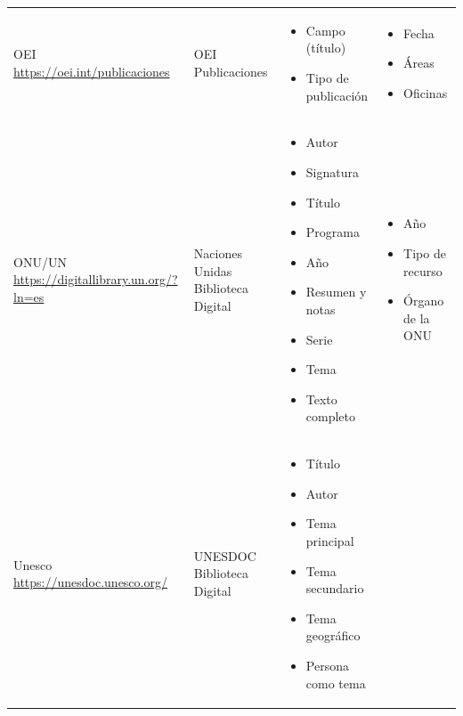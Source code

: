 \begin{table}[htpb]
\begin{threeparttable}
\begin{tabular}{
>{\raggedright\arraybackslash}p{}
>{\raggedright\arraybackslash}p{}
>{\raggedright\arraybackslash}p{}
>{\raggedright\arraybackslash}p{}}
    OEI \url{https://oei.int/publicaciones} & 
    OEI Publicaciones &
        \begin{itemize}[leftmargin=*, nosep]
            \item Campo (título)
            \item Tipo de publicación
        \end{itemize}
     &
        \begin{itemize}[leftmargin=*, nosep]
            \item Fecha
            \item Áreas
            \item Oficinas
        \end{itemize}
     \\ 
    ONU/UN \url{https://digitallibrary.un.org/?ln=es} &
    Naciones Unidas Biblioteca Digital &
        \begin{itemize}[leftmargin=*, nosep]
            \item Autor
            \item Signatura
            \item Título
            \item Programa
            \item Año
            \item Resumen y notas
            \item Serie
            \item Tema
            \item Texto completo
        \end{itemize}
     &
        \begin{itemize}[leftmargin=*, nosep]
            \item Año
            \item Tipo de recurso
            \item Órgano de la ONU
        \end{itemize}
     \\ 
    Unesco \url{https://unesdoc.unesco.org/} & 
    UNESDOC Biblioteca Digital &
        \begin{itemize}[leftmargin=*, nosep]
            \item Título
            \item Autor
            \item Tema principal
            \item Tema secundario
            \item Tema geográfico
            \item Persona como tema

\end{itemize}
\end{tabular}
\end{threeparttable}
\end{table}

